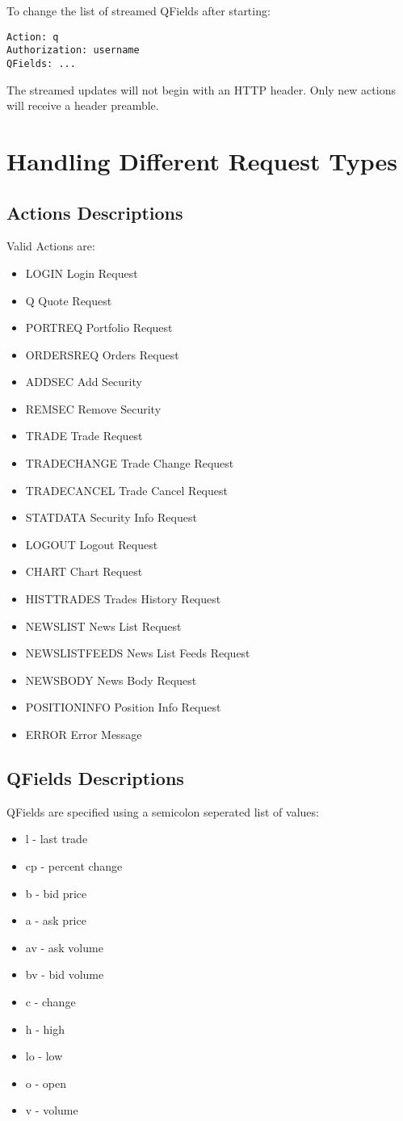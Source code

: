 \documentclass[12pt,twoside,letterpaper]{report}
\begin{document}
To change the list of streamed QFields after starting:
\begin{verbatim}
Action: q
Authorization: username
QFields: ...
\end{verbatim}

The streamed updates will not begin with an HTTP header. Only new actions will receive a header preamble.

\chapter*{Handling Different Request Types}
\section*{Actions Descriptions}
Valid Actions are:
\begin{itemize}
\item LOGIN Login Request
\item Q Quote Request
\item PORTREQ Portfolio Request
\item ORDERSREQ Orders Request
\item ADDSEC Add Security
\item REMSEC Remove Security
\item TRADE Trade Request
\item TRADECHANGE Trade Change Request
\item TRADECANCEL Trade Cancel Request
\item STATDATA Security Info Request
\item LOGOUT Logout Request
\item CHART Chart Request
\item HISTTRADES Trades History Request
\item NEWSLIST News List Request
\item NEWSLISTFEEDS News List Feeds Request
\item NEWSBODY News Body Request
\item POSITIONINFO Position Info Request
\item ERROR Error Message
\end{itemize}

\section*{QFields Descriptions}
QFields are specified using a semicolon seperated list of values:
\begin{itemize}
\item l - last trade
\item cp - percent change
\item b - bid price
\item a - ask price
\item av - ask volume
\item bv - bid volume
\item c - change
\item h - high
\item lo - low
\item o - open
\item v - volume
\end{itemize}
\end{document}
